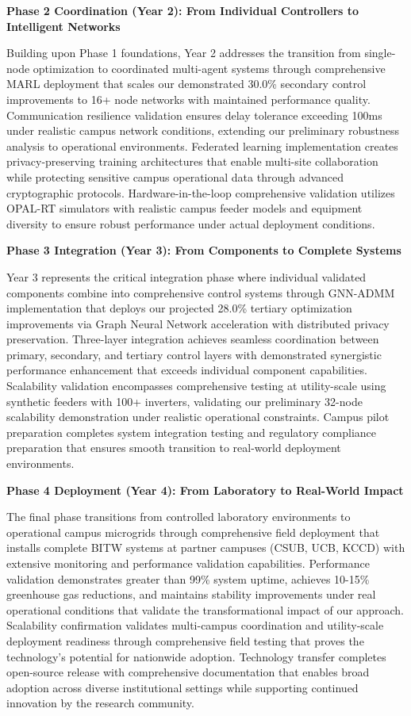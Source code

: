\documentclass[12pt]{article}
\begin{document}
\textbf{Phase 2 Coordination (Year 2): From Individual Controllers to Intelligent Networks}

Building upon Phase 1 foundations, Year 2 addresses the transition from single-node optimization to coordinated multi-agent systems through comprehensive MARL deployment that scales our demonstrated 30.0\% secondary control improvements to 16+ node networks with maintained performance quality. Communication resilience validation ensures delay tolerance exceeding 100ms under realistic campus network conditions, extending our preliminary robustness analysis to operational environments. Federated learning implementation creates privacy-preserving training architectures that enable multi-site collaboration while protecting sensitive campus operational data through advanced cryptographic protocols. Hardware-in-the-loop comprehensive validation utilizes OPAL-RT simulators with realistic campus feeder models and equipment diversity to ensure robust performance under actual deployment conditions.

\textbf{Phase 3 Integration (Year 3): From Components to Complete Systems}

Year 3 represents the critical integration phase where individual validated components combine into comprehensive control systems through GNN-ADMM implementation that deploys our projected 28.0\% tertiary optimization improvements via Graph Neural Network acceleration with distributed privacy preservation. Three-layer integration achieves seamless coordination between primary, secondary, and tertiary control layers with demonstrated synergistic performance enhancement that exceeds individual component capabilities. Scalability validation encompasses comprehensive testing at utility-scale using synthetic feeders with 100+ inverters, validating our preliminary 32-node scalability demonstration under realistic operational constraints. Campus pilot preparation completes system integration testing and regulatory compliance preparation that ensures smooth transition to real-world deployment environments.

\textbf{Phase 4 Deployment (Year 4): From Laboratory to Real-World Impact}

The final phase transitions from controlled laboratory environments to operational campus microgrids through comprehensive field deployment that installs complete BITW systems at partner campuses (CSUB, UCB, KCCD) with extensive monitoring and performance validation capabilities. Performance validation demonstrates greater than 99\% system uptime, achieves 10-15\% greenhouse gas reductions, and maintains stability improvements under real operational conditions that validate the transformational impact of our approach. Scalability confirmation validates multi-campus coordination and utility-scale deployment readiness through comprehensive field testing that proves the technology's potential for nationwide adoption. Technology transfer completes open-source release with comprehensive documentation that enables broad adoption across diverse institutional settings while supporting continued innovation by the research community.
\end{document}
